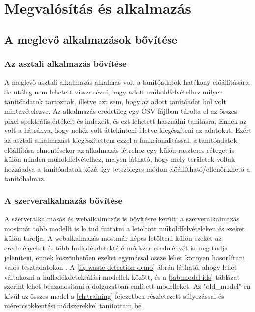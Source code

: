 \chapter{Megvalósítás és alkalmazás}
\label{ch:impl}

\section{A meglevő alkalmazások bővítése}
\label{ch:application-improvement}

\subsection {Az asztali alkalmazás bővítése}

A meglevő asztali alkalmazás alkalmas volt a tanítóadatok hatékony előállítására, de utólag nem lehetett visszanézni, hogy adott műholdfelvételhez milyen tanítóadatok tartoznak, illetve azt sem, hogy az adott tanítóadat hol volt mintavételezve. Az alkalmazás eredetileg egy CSV fájlban \cite{rfc4180} tárolta el az összes pixel spektrális értékeit és indexeit, és ezt lehetett használni tanításra. Ennek az volt a hátránya, hogy nehéz volt áttekinteni illetve kiegészíteni az adatokat. Ezért az asztali alkalmazást kiegészítettem ezzel a funkcionalitással, a tanítóadatok előállítása elmentésekor az alkalmazás létrehoz egy külön raszteres réteget is külön minden műholdfelvételhez, melyen látható, hogy mely területek voltak hozzáadva a tanítóadatok közé, így tetszőleges módon előállítható/ellenőrizhető a tanítóhalmaz.

\subsection {A szerveralkalmazás bővítése}

A szerveralkalmazás és webalkalmazás is bővítésre került: a szerveralkalmazás mostmár több modellt is le tud futtatni a letöltött műholdfelvételeken és ezeket külön tárolja. A webalkalmazás mostmár képes letölteni külön ezeket az eredményeket és több hulladékdetektáló módszer eredményét is meg tudja jeleníteni, ennek köszönhetően ezeket egymással össze lehet könnyen hasonlítani valós tesztadatokon . A \ref{fig:waste-detection-demo} ábrán látható, ahogy lehet váltakozni a hulladékdetektálási modellek között, és a \ref{tab:model-ids} táblázat szerint lehet beazonosítani a dolgozatban említett modelleket. Az "old\_model"-en kívül az összes model a \ref{ch:training} fejezetben részletezett súlyozással és méretcsökkentési módszerekkel tanítottam be.

